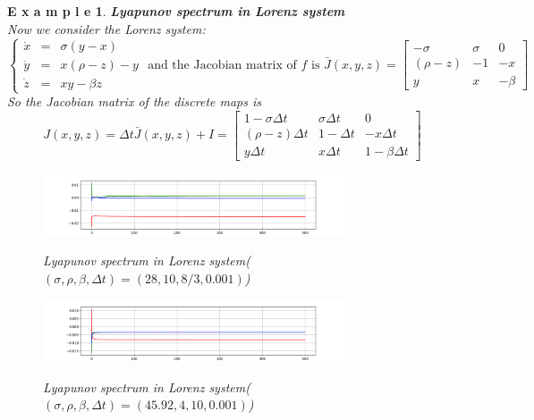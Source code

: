 \documentclass[12pt]{article}
\theoremstyle{plain}
\newtheorem{example}{\textbf{E x a m p l e}}[section]
\begin{document}
\begin{example}\textbf{Lyapunov spectrum in Lorenz system}
\\\noindent Now we consider the Lorenz system:
$$
\left\{\begin{array}{lll}
\dot x & = & \sigma(y - x) \\
\dot y & = & x(\rho - z) - y \\
\dot z & = & xy - \beta z
\end{array}\right. \text{ and the Jacobian matrix of $f$ is } \bar J(x, y, z) = \left[\begin{array}{lll}
-\sigma     & \sigma    & 0         \\
(\rho-z)    & -1        & -x        \\
y           & x         & -\beta
\end{array}\right]
$$
So the Jacobian matrix of the discrete maps is 
$$
J(x, y, z) = \Delta t\bar J(x, y, z) + I = \left[\begin{array}{lll}
1 - \sigma \Delta t     & \sigma \Delta t       & 0                     \\
(\rho-z) \Delta t       & 1 -\Delta t           & -x\Delta t            \\
y\Delta t               & x\Delta t             & 1 -\beta \Delta t
\end{array}\right]
$$
\begin{figure}[H]
\begin{center}
\includegraphics[width=0.8\textwidth]{figure/section3/Lya-spec-Lorenz-1.png} \\
\caption{Lyapunov spectrum in Lorenz system($(\sigma, \rho, \beta, \Delta t) = (28, 10, 8/3, 0.001)$)}
\end{center}
\end{figure}
\begin{figure}[H]
\begin{center}
\includegraphics[width=0.8\textwidth]{figure/section3/Lya-spec-Lorenz-2.png} \\
\caption{Lyapunov spectrum in Lorenz system($(\sigma, \rho, \beta, \Delta t) = (45.92, 4, 10, 0.001)$)}
\end{center}
\end{figure}
\end{example}
\end{document}
